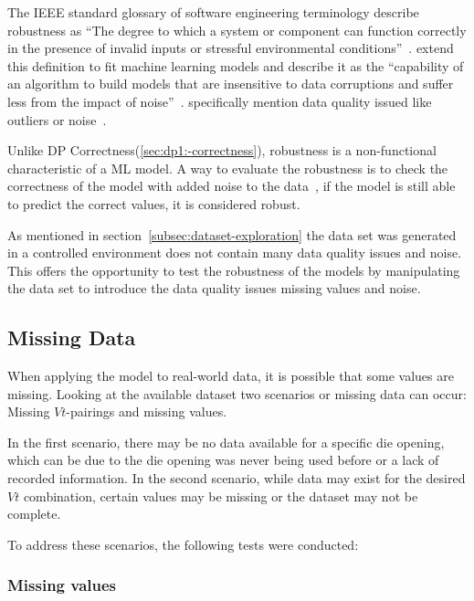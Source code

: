 The IEEE standard glossary of software engineering terminology describe
robustness as ``The degree
to which a system or component can function correctly in the presence of
invalid inputs or
stressful environmental conditions''~\cite[p. 64]{terminology1990ieee}.
\cite{saez2016evaluating} extend this definition to fit machine learning
models and describe it
as the ``capability of an algorithm to build models that are insensitive to
data corruptions and
suffer less from the impact of noise''~\cite[p.
2]{saez_evaluatingclassifierbehavior_2016}.
\cite{siebert2022construction} specifically mention data quality issued like
outliers or noise~\cite[p. 16]{siebert2022construction}.

Unlike \ac{DP} Correctness(\ref{sec:dp1:-correctness}), robustness is a
non-functional characteristic of a \ac{ML} model.
A way to evaluate the robustness is to check the correctness of the model with
added noise to the data~\cite[p. 18]{zhou_machinelearning_2021}, if the model
is still able to predict the correct values, it is considered robust.

As mentioned in section~\ref{subsec:dataset-exploration} the data set
was generated in a controlled environment does not contain many data quality
issues and noise.
This offers the opportunity to test the robustness of the models by manipulating the
data set to introduce the data quality issues missing values and noise.

\subsection{Missing Data}\label{subsec:missing-data}
When applying the model to real-world data, it is possible that some values
are missing.
Looking at the available dataset two scenarios or missing data can occur:
Missing \(Vt\)-pairings and missing values.

In the first scenario, there may be no data available for a specific die
opening, which can be due to the die opening was never being used before or a
lack of recorded
information.
In the second scenario, while data may exist for the desired \(Vt\)
combination, certain values may
be missing or the dataset may not be complete.

To address these scenarios, the following tests were conducted:

\subsubsection{Missing values}


